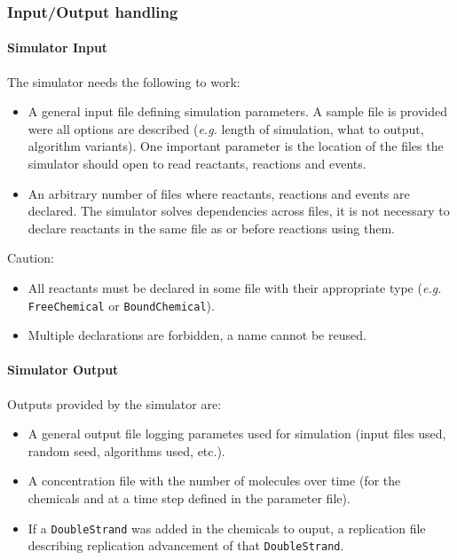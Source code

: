 
\subsubsection{Input/Output handling}

\paragraph{Simulator Input}

The simulator needs the following to work:
\begin{itemize}
  \item A general input file defining simulation parameters. A sample file is provided were all options are described (\textit{e.g.} length of simulation, what to output, algorithm variants). One important parameter is the location of the files the simulator should open to read reactants, reactions and events.
  \item An arbitrary number of files where reactants, reactions and events are declared. The simulator solves dependencies across files, it is not necessary to declare reactants in the same file as or before reactions using them.
\end{itemize}

Caution:
\begin{itemize}
\item All reactants must be declared in some file with their appropriate type (\textit{e.g.} \texttt{FreeChemical} or \texttt{BoundChemical}).
\item Multiple declarations are forbidden, a name cannot be reused.
\end{itemize}

\paragraph{Simulator Output}

Outputs provided by the simulator are:
\begin{itemize}
\item A general output file logging parametes used for simulation (input files used, random seed, algorithms used, etc.).
\item A concentration file with the number of molecules over time (for the chemicals and at a time step defined in the parameter file).
\item If a \texttt{DoubleStrand} was added in the chemicals to ouput, a replication file describing replication advancement of that \texttt{DoubleStrand}.
\end{itemize}
